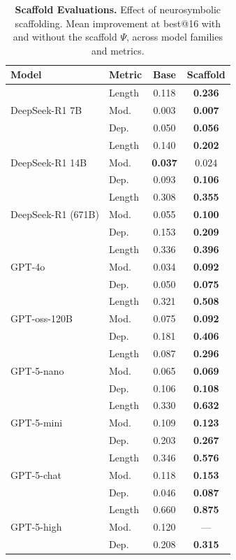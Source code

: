 \begin{table}[ht]
\centering
\caption{\textbf{Scaffold Evaluations.} Effect of neurosymbolic scaffolding. Mean improvement at best@16 with and without the scaffold $\Psi$, across model families and metrics.}
\label{tab:imp2_scaffold}
\small
\setlength{\tabcolsep}{6pt}
\begin{tabular}{llcc}
\toprule
\textbf{Model} & \textbf{Metric} & \textbf{Base} & \textbf{Scaffold} \\
\midrule
\multirow{3}{*}{DeepSeek-R1 7B}
  & Length & 0.118 & \textbf{0.236} \\
  & Mod.   & 0.003 & \textbf{0.007} \\
  & Dep.   & 0.050 & \textbf{0.056} \\
\midrule
\multirow{3}{*}{DeepSeek-R1 14B}
  & Length & 0.140 & \textbf{0.202} \\
  & Mod.   & \textbf{0.037} & 0.024 \\
  & Dep.   & 0.093 & \textbf{0.106} \\
\midrule
\multirow{3}{*}{DeepSeek-R1 (671B)}
  & Length & 0.308 & \textbf{0.355} \\
  & Mod.   & 0.055 & \textbf{0.100} \\
  & Dep.   & 0.153 & \textbf{0.209} \\
\midrule
\multirow{3}{*}{GPT-4o}
  & Length & 0.336 & \textbf{0.396} \\
  & Mod.   & 0.034 & \textbf{0.092} \\
  & Dep.   & 0.050 & \textbf{0.075} \\
\midrule
\multirow{3}{*}{GPT-oss-120B}
  & Length & 0.321 & \textbf{0.508} \\
  & Mod.   & 0.075 & \textbf{0.092} \\
  & Dep.   & 0.181 & \textbf{0.406} \\
\midrule
\multirow{3}{*}{GPT-5-nano}
  & Length & 0.087 & \textbf{0.296} \\
  & Mod.   & 0.065 & \textbf{0.069} \\
  & Dep.   & 0.106 & \textbf{0.108} \\
\midrule
\multirow{3}{*}{GPT-5-mini}
  & Length & 0.330 & \textbf{0.632} \\
  & Mod.   & 0.109 & \textbf{0.123} \\
  & Dep.   & 0.203 & \textbf{0.267} \\
\midrule
\multirow{3}{*}{GPT-5-chat}
  & Length & 0.346 & \textbf{0.576} \\
  & Mod.   & 0.118 & \textbf{0.153} \\
  & Dep.   & 0.046 & \textbf{0.087} \\
\midrule
\multirow{3}{*}{GPT-5-high}
  & Length & 0.660 & \textbf{0.875} \\
  & Mod.   & 0.120 & --- \\
  & Dep.   & 0.208 & \textbf{0.315} \\
\bottomrule
\end{tabular}
\end{table}



